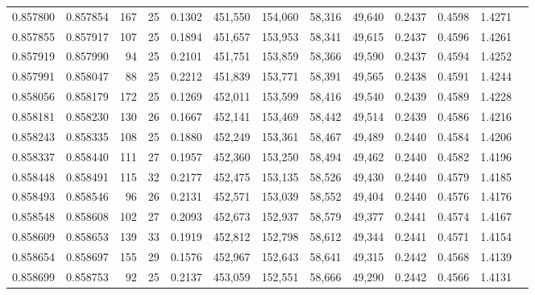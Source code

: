 \begin{tabular}{rrrrrrrrrrrrr}
0.857800 & 0.857854 &   167 &  25 &                                     0.1302 & 451,550 & 154,060 &  58,316 &  49,640 & 0.2437 & 0.4598 & 1.4271 \\
0.857855 & 0.857917 &   107 &  25 &                                     0.1894 & 451,657 & 153,953 &  58,341 &  49,615 & 0.2437 & 0.4596 & 1.4261 \\
0.857919 & 0.857990 &    94 &  25 &                                     0.2101 & 451,751 & 153,859 &  58,366 &  49,590 & 0.2437 & 0.4594 & 1.4252 \\
0.857991 & 0.858047 &    88 &  25 &                                     0.2212 & 451,839 & 153,771 &  58,391 &  49,565 & 0.2438 & 0.4591 & 1.4244 \\
0.858056 & 0.858179 &   172 &  25 &                                     0.1269 & 452,011 & 153,599 &  58,416 &  49,540 & 0.2439 & 0.4589 & 1.4228 \\
0.858181 & 0.858230 &   130 &  26 &                                     0.1667 & 452,141 & 153,469 &  58,442 &  49,514 & 0.2439 & 0.4586 & 1.4216 \\
0.858243 & 0.858335 &   108 &  25 &                                     0.1880 & 452,249 & 153,361 &  58,467 &  49,489 & 0.2440 & 0.4584 & 1.4206 \\
0.858337 & 0.858440 &   111 &  27 &                                     0.1957 & 452,360 & 153,250 &  58,494 &  49,462 & 0.2440 & 0.4582 & 1.4196 \\
0.858448 & 0.858491 &   115 &  32 &                                     0.2177 & 452,475 & 153,135 &  58,526 &  49,430 & 0.2440 & 0.4579 & 1.4185 \\
0.858493 & 0.858546 &    96 &  26 &                                     0.2131 & 452,571 & 153,039 &  58,552 &  49,404 & 0.2440 & 0.4576 & 1.4176 \\
0.858548 & 0.858608 &   102 &  27 &                                     0.2093 & 452,673 & 152,937 &  58,579 &  49,377 & 0.2441 & 0.4574 & 1.4167 \\
0.858609 & 0.858653 &   139 &  33 &                                     0.1919 & 452,812 & 152,798 &  58,612 &  49,344 & 0.2441 & 0.4571 & 1.4154 \\
0.858654 & 0.858697 &   155 &  29 &                                     0.1576 & 452,967 & 152,643 &  58,641 &  49,315 & 0.2442 & 0.4568 & 1.4139 \\
0.858699 & 0.858753 &    92 &  25 &                                     0.2137 & 453,059 & 152,551 &  58,666 &  49,290 & 0.2442 & 0.4566 & 1.4131 \\

\end{tabular}
